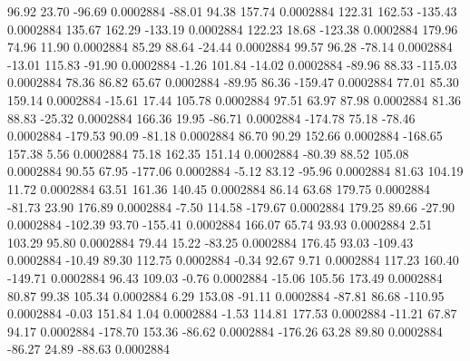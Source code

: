        96.92       23.70      -96.69     0.0002884
      -88.01       94.38      157.74     0.0002884
      122.31      162.53     -135.43     0.0002884
      135.67      162.29     -133.19     0.0002884
      122.23       18.68     -123.38     0.0002884
      179.96       74.96       11.90     0.0002884
       85.29       88.64      -24.44     0.0002884
       99.57       96.28      -78.14     0.0002884
      -13.01      115.83      -91.90     0.0002884
       -1.26      101.84      -14.02     0.0002884
      -89.96       88.33     -115.03     0.0002884
       78.36       86.82       65.67     0.0002884
      -89.95       86.36     -159.47     0.0002884
       77.01       85.30      159.14     0.0002884
      -15.61       17.44      105.78     0.0002884
       97.51       63.97       87.98     0.0002884
       81.36       88.83      -25.32     0.0002884
      166.36       19.95      -86.71     0.0002884
     -174.78       75.18      -78.46     0.0002884
     -179.53       90.09      -81.18     0.0002884
       86.70       90.29      152.66     0.0002884
     -168.65      157.38        5.56     0.0002884
       75.18      162.35      151.14     0.0002884
      -80.39       88.52      105.08     0.0002884
       90.55       67.95     -177.06     0.0002884
       -5.12       83.12      -95.96     0.0002884
       81.63      104.19       11.72     0.0002884
       63.51      161.36      140.45     0.0002884
       86.14       63.68      179.75     0.0002884
      -81.73       23.90      176.89     0.0002884
       -7.50      114.58     -179.67     0.0002884
      179.25       89.66      -27.90     0.0002884
     -102.39       93.70     -155.41     0.0002884
      166.07       65.74       93.93     0.0002884
        2.51      103.29       95.80     0.0002884
       79.44       15.22      -83.25     0.0002884
      176.45       93.03     -109.43     0.0002884
      -10.49       89.30      112.75     0.0002884
       -0.34       92.67        9.71     0.0002884
      117.23      160.40     -149.71     0.0002884
       96.43      109.03       -0.76     0.0002884
      -15.06      105.56      173.49     0.0002884
       80.87       99.38      105.34     0.0002884
        6.29      153.08      -91.11     0.0002884
      -87.81       86.68     -110.95     0.0002884
       -0.03      151.84        1.04     0.0002884
       -1.53      114.81      177.53     0.0002884
      -11.21       67.87       94.17     0.0002884
     -178.70      153.36      -86.62     0.0002884
     -176.26       63.28       89.80     0.0002884
      -86.27       24.89      -88.63     0.0002884
